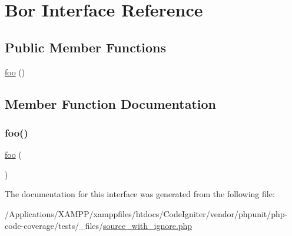 \hypertarget{interface_bor}{}\section{Bor Interface Reference}
\label{interface_bor}
\subsection*{Public Member Functions}
\begin{DoxyCompactItemize}
\item 
\mbox{\hyperlink{interface_bor_a79418a120498dd9cf915655654607747}{foo}} ()
\end{DoxyCompactItemize}


\subsection{Member Function Documentation}
\mbox{\label{interface_bor_a79418a120498dd9cf915655654607747}} 
\subsubsection{\texorpdfstring{foo()}{foo()}}
{\footnotesize\ttfamily \mbox{\hyperlink{interfacefoo}{foo}} (\begin{DoxyParamCaption}{ }\end{DoxyParamCaption})}



The documentation for this interface was generated from the following file\+:\begin{DoxyCompactItemize}
\item 
/\+Applications/\+X\+A\+M\+P\+P/xamppfiles/htdocs/\+Code\+Igniter/vendor/phpunit/php-\/code-\/coverage/tests/\+\_\+files/\mbox{\hyperlink{source__with__ignore_8php}{source\+\_\+with\+\_\+ignore.\+php}}\end{DoxyCompactItemize}
